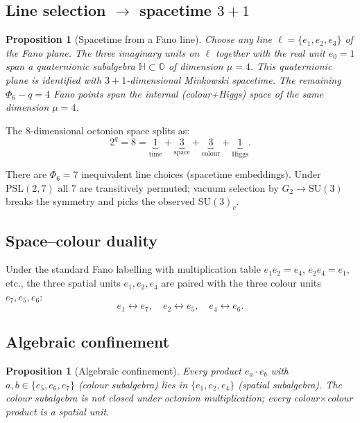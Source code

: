 \documentclass[12pt,a4paper]{article}
\newtheorem{proposition}[theorem]{Proposition}
\theoremstyle{definition}
\newcommand{\SU}{\mathrm{SU}}
\newcommand{\Phisix}{\Phi_6}
\newcommand{\HH}{\mathbb{H}}
\newcommand{\OO}{\mathbb{O}}
\newcommand{\PSL}{\mathrm{PSL}}
\begin{document}
\subsection{Line selection \texorpdfstring{$\to$}{->} spacetime \texorpdfstring{$3+1$}{3+1}}

\begin{proposition}[Spacetime from a Fano line]
\label{prop:spacetime}
Choose any line $\ell=\{e_1,e_2,e_3\}$ of the Fano plane.  The three
imaginary units on $\ell$ together with the real unit $e_0=1$ span a
quaternionic subalgebra $\HH\subset\OO$ of dimension $\mu=4$.
This quaternionic plane is identified with $3+1$-dimensional Minkowski
spacetime.  The remaining $\Phisix-q=4$ Fano points span the internal
(colour+Higgs) space of the same dimension $\mu=4$.
\end{proposition}

The $8$-dimensional octonion space splits as:
\begin{equation}
  \label{eq:8split}
  2^q = 8 = \underbrace{1}_{\text{time}}
           + \underbrace{3}_{\text{space}}
           + \underbrace{3}_{\text{colour}}
           + \underbrace{1}_{\text{Higgs}}.
\end{equation}

There are $\Phisix=7$ inequivalent line choices (spacetime embeddings).
Under $\PSL(2,7)$ all $7$ are transitively permuted; vacuum selection
by $G_2\to\SU(3)$ breaks the symmetry and picks the observed $\SU(3)_c$.

\subsection{Space--colour duality}

Under the standard Fano labelling with multiplication table
$e_1e_2=e_4$, $e_2e_4=e_1$, etc., the three spatial units $e_1,e_2,e_4$
are paired with the three colour units $e_7,e_5,e_6$:
\begin{equation}
  \label{eq:duality}
  e_1\leftrightarrow e_7, \quad
  e_2\leftrightarrow e_5, \quad
  e_4\leftrightarrow e_6.
\end{equation}

\subsection{Algebraic confinement}

\begin{proposition}[Algebraic confinement]
Every product $e_a\cdot e_b$ with $a,b\in\{e_5,e_6,e_7\}$ (colour
subalgebra) lies in $\{e_1,e_2,e_4\}$ (spatial subalgebra).
The colour subalgebra is not closed under octonion multiplication;
every colour$\times$colour product is a spatial unit.
\end{proposition}
\end{document}
